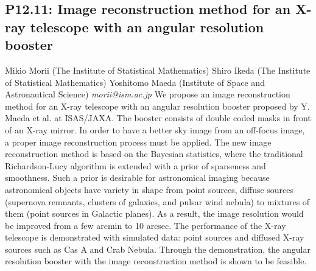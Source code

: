 \documentclass{report}
\begin{document}
\subsection*{P12.11: Image reconstruction method for an X-ray telescope with an angular resolution booster}
\bigskip
Mikio Morii (The Institute of Statistical Mathematics) \newline Shiro Ikeda (The Institute of Statistical Mathematics) \newline  Yoshitomo Maeda (Institute of Space and Astronautical Science)\newline   \newline  \newline  \newline\newline
{\it morii@ism.ac.jp}\newline
\newline\newline
We propose an image reconstruction method for an X-ray telescope with
an angular resolution booster proposed by Y. Maeda et al. at
ISAS/JAXA. The booster consists of double coded masks in front of an
X-ray mirror. In order to have a better sky image from an off-focus
image, a proper image reconstruction process must be applied. The new
image reconstruction method is based on the Bayesian statistics, where
the traditional Richardson-Lucy algorithm is extended with a prior of
sparseness and smoothness. Such a prior is desirable for astronomical
imaging because astronomical objects have variety in shape from point
sources, diffuse sources (supernova remnants, clusters of galaxies,
and pulsar wind nebula) to mixtures of them (point sources in Galactic
planes). As a result, the image resolution would be improved from a
few arcmin to 10 arcsec. The performance of the X-ray telescope is
demonstrated with simulated data: point sources and diffused X-ray
sources such as Cas A and Crab Nebula. Through the demonstration, the
angular resolution booster with the image reconstruction method is
shown to be feasible.\newline
\newpage
\end{document}
